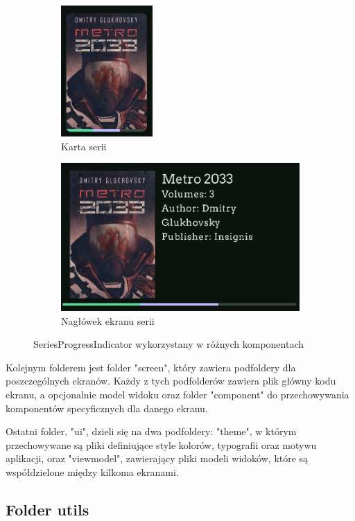 \documentclass[12pt,twoside]{article}
\begin{document}
\begin{figure}[ht]
	\centering
	\begin{subfigure}[b]{0.2\textwidth}
	  \includegraphics[]{figures/karta.png}
	  \caption{Karta serii}
	\end{subfigure}
	\hfill
	\begin{subfigure}[b]{0.6\textwidth}
	  \includegraphics[]{figures/header.png}
	  \caption{Nagłówek ekranu serii}
	\end{subfigure}
	\caption{SeriesProgressIndicator wykorzystany w różnych komponentach}
	\label{fig:SeriesProgressIndicator}
\end{figure}

Kolejnym folderem jest folder "screen", który zawiera podfoldery dla poszczególnych ekranów. Każdy z tych podfolderów 
zawiera plik główny kodu ekranu, a opcjonalnie model widoku oraz folder "component" do przechowywania komponentów 
specyficznych dla danego ekranu.

Ostatni folder, "ui", dzieli się na dwa podfoldery: "theme", w którym przechowywane są pliki definiujące style 
kolorów, typografii oraz motywu aplikacji, oraz "viewmodel", zawierający pliki modeli widoków, które są współdzielone 
między kilkoma ekranami.

\subsection{Folder utils}
\end{document}

